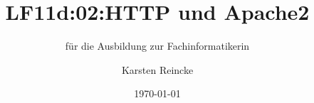 \documentclass[]{beamer}
\title{LF11d:02:HTTP und Apache2}
\subtitle{für die Ausbildung zur Fachinformatikerin}
\institute{GS-LDK}
\author{Karsten Reincke}
\date{\today}
\def\cfgGl{../../../cfg.gl/}
\begin{document}

\begin{frame}
  \titlepage
\end{frame}






\logo{}
\newpage




\end{document}
